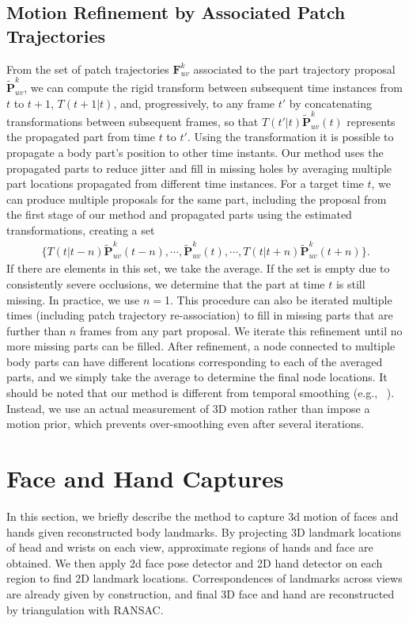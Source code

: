 \subsection{Motion Refinement by Associated Patch Trajectories}
From the set of patch trajectories $\mathbf{F}_{uv}^k$ associated to the part trajectory proposal $\mathbf{\tilde{P}}_{uv}^k$, we can compute the rigid transform between subsequent time instances from $t$ to $t{+}1$, $T(t{+}1\left|\right.t) $, and, progressively, to any frame $t'$ by concatenating transformations between subsequent frames, so that $T(t'\left|\right.t)\mathbf{\tilde{P}}_{uv}^k(t)$ represents the propagated part from time $t$ to $t'$. Using the transformation it is possible to propagate a body part's position to other time instants. Our method uses the propagated parts to reduce jitter and fill in missing holes by averaging multiple part locations propagated from different time instances. For a target time $t$, we can produce multiple proposals for the same part, including the proposal from the first stage of our method and propagated parts using the estimated transformations, creating a set 
\begin{gather}
\{ T(t\left|\right.t{-}n) \mathbf{\tilde{P}}_{uv}^k(t{-}n),\cdots\!,\mathbf{\tilde{P}}_{uv}^k(t),\cdots\!,T(t\left|\right.t{+}n) \mathbf{\tilde{P}}_{uv}^k(t{+}n) \}.		\nonumber
\end{gather}
If there are elements in this set, we take the average. If the set is empty due to consistently severe occlusions, we determine that the part at time $t$ is still missing. In practice, we use $n{=}$1. This procedure can also be iterated multiple times (including patch trajectory re-association) to fill in missing parts that are further than $n$ frames from any part proposal. We iterate this refinement until no more missing parts can be filled. After refinement, a node connected to multiple body parts can have different locations corresponding to each of the averaged parts, and we simply take the average to determine the final node locations. It should be noted that our method is different from temporal smoothing (e.g., ~\cite{Elhayek-16}). Instead, we use an actual measurement of 3D motion rather than impose a motion prior, which prevents over-smoothing even after several iterations. 


\section{Face and Hand Captures}
In this section, we briefly describe the method to capture 3d motion of faces and hands given reconstructed body landmarks. By projecting 3D landmark locations of head and wrists on each view, approximate regions of hands and face are obtained. We then apply 2d face pose detector and 2D hand detector on each region to find 2D landmark locations. Correspondences of landmarks across views are already given by construction, and final 3D face and hand are reconstructed by triangulation with RANSAC. 


